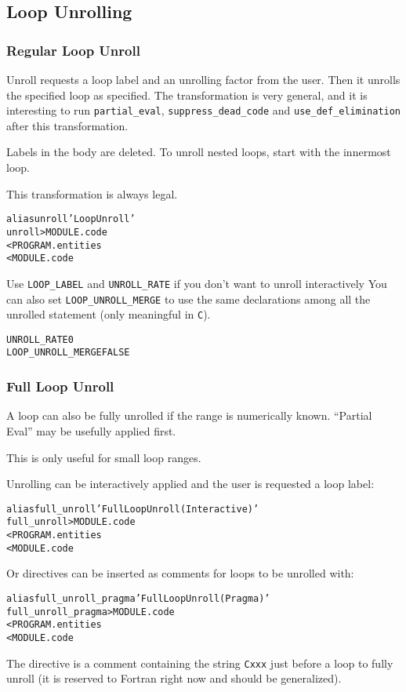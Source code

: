 \documentclass[a4paper]{report}
\newenvironment{PipsProp}{\begin{alltt}}{\end{alltt}}
\newenvironment{PipsMake}{\begin{alltt}}{\end{alltt}}
\newcommand{\PPartialEval}{{Partial Eval}}
\begin{document}
\subsection{Loop Unrolling}
\label{subsection-loop-unrolling}

\subsubsection{Regular Loop Unroll}

Unroll requests a loop label and an unrolling factor from the user.
Then it unrolls the specified loop as specified. The transformation is
very general, and it is interesting to run \verb+partial_eval+,
\verb+suppress_dead_code+ and \verb+use_def_elimination+ after this
transformation.

Labels in the body are deleted. To unroll nested loops, start with the
innermost loop.

This transformation is always legal.

\begin{PipsMake}
alias unroll 'Loop Unroll'
unroll                          > MODULE.code
        < PROGRAM.entities
        < MODULE.code
\end{PipsMake}

Use \lstinline|LOOP_LABEL| and \lstinline|UNROLL_RATE| if you don't want to unroll interactively
You can also set \lstinline|LOOP_UNROLL_MERGE| to use the same declarations among all the unrolled statement
(only meaningful in \texttt{C}).
\begin{PipsProp}
UNROLL_RATE 0
LOOP_UNROLL_MERGE FALSE
\end{PipsProp}


\subsubsection{Full Loop Unroll}

A loop can also be fully unrolled if the range is numerically known.
``\PPartialEval'' may be usefully applied first.

This is only useful for small loop ranges.

Unrolling can be interactively applied and the user is requested a loop
label:

\begin{PipsMake}
alias full_unroll 'Full Loop Unroll (Interactive)'
full_unroll                          > MODULE.code
        < PROGRAM.entities
        < MODULE.code
\end{PipsMake}
Or directives can be inserted as comments for loops to be unrolled with:
\begin{PipsMake}
alias full_unroll_pragma 'Full Loop Unroll (Pragma)'
full_unroll_pragma                   > MODULE.code
        < PROGRAM.entities
        < MODULE.code
\end{PipsMake}
The directive is a comment containing the string \texttt{Cxxx} just before
a loop to fully unroll (it is reserved to Fortran right now and should be
generalized).
\end{document}

